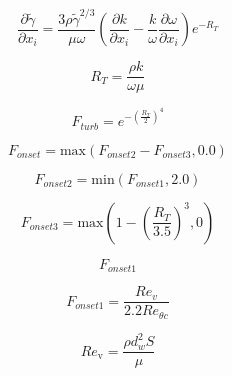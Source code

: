 {\newpage\clearpage
{}%
\begin{displaymath}
  \frac{\partial \widetilde{\gamma}}{\partial x_i} = \frac{3\rho\widetilde{\gamma}^{2/3}}{\mu \omega} \left(\frac{\partial k}{\partial x_i} - \frac{k}{\omega}\frac{\partial \omega}{\partial x_i}\right)e^{-R_T}
\end{displaymath}%
\lthtmldisplayZ
\lthtmlcheckvsize\clearpage}

{\newpage\clearpage
{}%
\begin{displaymath}
    R_T = \frac{\rho k}{\omega \mu}
\end{displaymath}%
\lthtmldisplayZ
\lthtmlcheckvsize\clearpage}

{\newpage\clearpage
{}%
\begin{displaymath}
  F_{turb} = e^{-\left(\frac{R_T}{2}\right)^4}
\end{displaymath}%
\lthtmldisplayZ
\lthtmlcheckvsize\clearpage}

{\newpage\clearpage
{}%
\begin{displaymath}
 F_{onset}  = \text{max}(F_{onset2} - F_{onset3}, 0.0) 
\end{displaymath}%
\lthtmldisplayZ
\lthtmlcheckvsize\clearpage}

{\newpage\clearpage
{}%
\begin{displaymath}
    F_{onset2} = \text{min}(F_{onset1}, 2.0)
\end{displaymath}%
\lthtmldisplayZ
\lthtmlcheckvsize\clearpage}

{\newpage\clearpage
{}%
\begin{displaymath}
    F_{onset3} = \text{max}\left( 1 - \left(\frac{R_T}{3.5}\right)^3, 0\right)
\end{displaymath}%
\lthtmldisplayZ
\lthtmlcheckvsize\clearpage}

{\newpage\clearpage
{}%
\begin{displaymath}
F_{onset1}
\end{displaymath}%
\lthtmldisplayZ
\lthtmlcheckvsize\clearpage}

{\newpage\clearpage
{}%
\begin{displaymath} 
F_{onset1} = \frac{Re_v}{2.2Re_{\theta c}}
\end{displaymath}%
\lthtmldisplayZ
\lthtmlcheckvsize\clearpage}

{\newpage\clearpage
{}%
\begin{displaymath}
  Re_\text{v} = \frac{\rho d_w^2 S}{\mu}
\end{displaymath}%
\lthtmldisplayZ
\lthtmlcheckvsize\clearpage}

